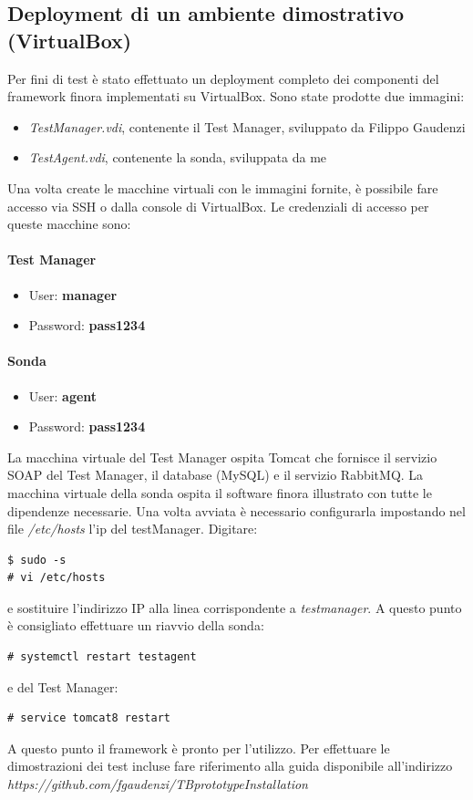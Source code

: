 \documentclass[../main.tex]{subfiles}
\begin{document}
\subsection {Deployment di un ambiente dimostrativo (VirtualBox)}
Per fini di test è stato effettuato un deployment completo dei componenti del framework finora implementati su VirtualBox.
Sono state prodotte due immagini:
\begin{itemize}
\item \textit{TestManager.vdi}, contenente il Test Manager, sviluppato da Filippo Gaudenzi
\item \textit{TestAgent.vdi}, contenente la sonda, sviluppata da me
\end{itemize}
Una volta create le macchine virtuali con le immagini fornite, è possibile fare accesso via SSH o dalla console di VirtualBox.
Le credenziali di accesso per queste macchine sono:
\paragraph{Test Manager}
\begin{itemize}
\item User: \textbf{manager}
\item Password: \textbf{pass1234}
\end{itemize}
\paragraph{Sonda}
\begin{itemize}
\item User: \textbf{agent}
\item Password: \textbf{pass1234}
\end{itemize}
La macchina virtuale del Test Manager ospita Tomcat che fornisce il servizio SOAP del Test Manager, il database (MySQL) e il servizio RabbitMQ. 
La macchina virtuale della sonda ospita il software finora illustrato con tutte le dipendenze necessarie. 
Una volta avviata è necessario configurarla impostando nel file \textit{/etc/hosts} l'ip del testManager.
Digitare:
\begin{verbatim}
$ sudo -s
# vi /etc/hosts
\end{verbatim}

e sostituire l'indirizzo IP alla linea corrispondente a \textit{testmanager}.
A questo punto è consigliato effettuare un riavvio della sonda:
\begin{verbatim}
# systemctl restart testagent
\end{verbatim}
e del Test Manager:
\begin{verbatim}
# service tomcat8 restart
\end{verbatim}
A questo punto il framework è pronto per l'utilizzo. Per effettuare le dimostrazioni dei test incluse fare riferimento alla guida disponibile all'indirizzo\newline
\textit{https://github.com/fgaudenzi/TBprototypeInstallation}	
\end{document}
